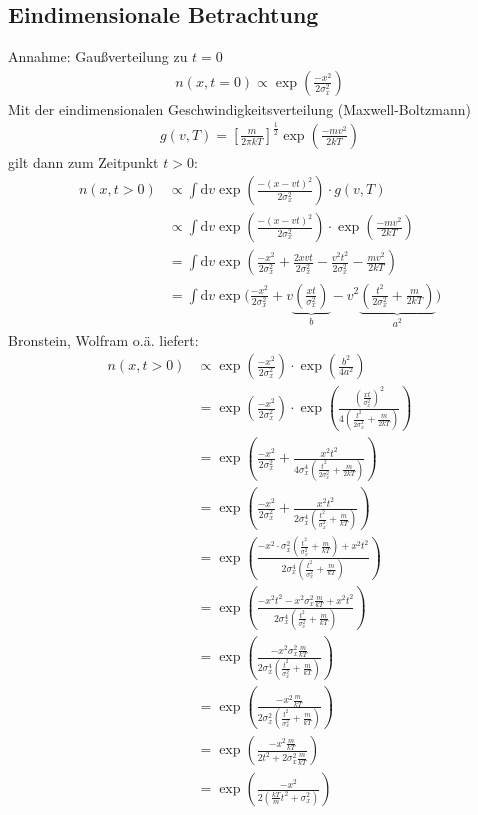 \documentclass[10pt,a4paper]{extarticle}
\begin{document}
\subsection*{Eindimensionale Betrachtung}
Annahme: Gaußverteilung zu $t = 0$
\begin{align}
n(x, t= 0) \varpropto \exp\left(\frac{-x^2}{2 \sigma_x^2}\right)
\end{align}
Mit der eindimensionalen Geschwindigkeitsverteilung (Maxwell-Boltzmann) 
\begin{align}
g(v,T) = \left[\frac{m}{2 \pi k T}\right]^{\frac{1}{2}} \exp \left(\frac{-mv^2}{2kT}\right)
\end{align}
gilt dann zum Zeitpunkt $t>0$:
\begin{align}
n(x, t> 0) &\varpropto \int \mathrm{d}v \exp\left(\frac{-(x-vt)^2}{2 \sigma_x^2}\right) \cdot g(v,T) \\
&\varpropto \int \mathrm{d}v \exp\left(\frac{-(x-vt)^2}{2 \sigma_x^2}\right) \cdot \exp \left(\frac{-mv^2}{2kT}\right) \label{eq:falt} \\
&= \int \mathrm{d}v \exp\left(\frac{-x^2}{2 \sigma_x^2} + \frac{2xvt}{2 \sigma_x^2} - \frac{v^2 t^2}{2 \sigma_x^2} - \frac{mv^2}{2kT}\right) \\
&= \int \mathrm{d}v \exp\biggl(\frac{-x^2}{2 \sigma_x^2} + v \underbrace{\left( \frac{xt}{\sigma_x^2}\right)}_{b} - v^2 \underbrace{\left(\frac{t^2}{2 \sigma_x^2} + \frac{m}{2kT} \right)}_{a^2}\biggr) 
\end{align}
Bronstein, Wolfram o.ä. liefert:
\begin{align}
n(x, t> 0) &\varpropto \exp\left(\frac{-x^2}{2 \sigma_x^2}\right) \cdot \exp \left(\frac{b^2}{4a^2}\right) \\
&= \exp\left(\frac{-x^2}{2 \sigma_x^2}\right) \cdot \exp \left(\frac{\left( \frac{xt}{\sigma_x^2}\right)^2}{4\left(\frac{t^2}{2 \sigma_x^2} + \frac{m}{2kT} \right)}\right) \\
&= \exp\left(\frac{-x^2}{2 \sigma_x^2} + \frac{x^2t^2}{4\sigma_x^4\left(\frac{t^2}{2 \sigma_x^2} + \frac{m}{2kT} \right)}\right) \\
&= \exp\left(\frac{-x^2}{2 \sigma_x^2} + \frac{x^2t^2}{2\sigma_x^4\left(\frac{t^2}{\sigma_x^2} + \frac{m}{kT} \right)}\right) \\
&= \exp\left(\frac{-x^2 \cdot \sigma_x^2\left(\frac{t^2}{\sigma_x^2} + \frac{m}{kT} \right) +x^2t^2}{2\sigma_x^4\left(\frac{t^2}{\sigma_x^2} + \frac{m}{kT} \right)}\right) \\
&= \exp\left(\frac{-x^2 t^2 -  x^2 \sigma_x^2 \frac{m}{kT} +x^2t^2}{2\sigma_x^4\left(\frac{t^2}{\sigma_x^2} + \frac{m}{kT} \right)}\right) \\
&= \exp\left(\frac{- x^2 \sigma_x^2 \frac{m}{kT}}{2\sigma_x^4\left(\frac{t^2}{\sigma_x^2} + \frac{m}{kT} \right)}\right) \\
&= \exp\left(\frac{- x^2 \frac{m}{kT}}{2\sigma_x^2\left(\frac{t^2}{\sigma_x^2} + \frac{m}{kT} \right)}\right) \\
&= \exp\left(\frac{- x^2 \frac{m}{kT}}{2t^2 +2 \sigma_x^2 \frac{m}{kT} }\right) \\
&= \exp\left(\frac{- x^2 }{2\left(\frac{kT}{m}t^2 + \sigma_x^2\right)}\right) 
\end{align}
\end{document}
